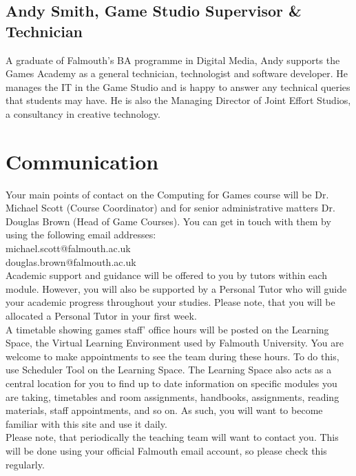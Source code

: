 \subsection{Andy Smith, Game Studio Supervisor \& Technician}

A graduate of Falmouth's BA programme in Digital Media, Andy supports the Games Academy as a general technician, technologist and software developer. He manages the IT in the Game Studio and is happy to answer any technical queries that students may have. He is also the Managing Director of Joint Effort Studios, a consultancy in creative technology.\\

\section{Communication}

Your main points of contact on the Computing for Games course will be Dr. Michael Scott (Course Coordinator) and for senior administrative matters Dr. Douglas Brown (Head of Game Courses). You can get in touch with them by using the following email addresses:\\

michael.scott@falmouth.ac.uk \\
douglas.brown@falmouth.ac.uk\\

Academic support and guidance will be offered to you by tutors within each module. However, you will also be supported by a Personal Tutor who will guide your academic progress throughout your studies. Please note, that you will be allocated a Personal Tutor in your first week.\\

A timetable showing games staff’ office hours will be posted on the Learning Space, the Virtual Learning Environment used by Falmouth University. You are welcome to make appointments to see the team during these hours. To do this, use Scheduler Tool on the Learning Space. The Learning Space also acts as a central location for you to find up to date information on specific modules you are taking, timetables and room assignments, handbooks, assignments, reading materials, staff appointments, and so on. As such, you will want to become familiar with this site and use it daily.\\

Please note, that periodically the teaching team will want to contact you. This will be done using your official Falmouth email account, so please check this regularly. \\

